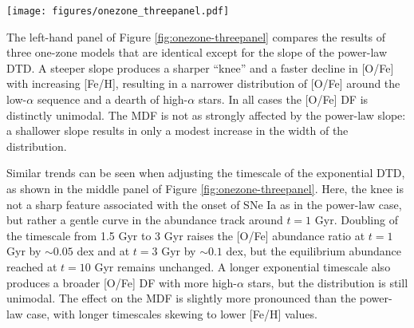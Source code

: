\documentclass[twocolumn,twocolappendix,linenumbers]{aastex631}
\begin{document}
\begin{figure*}
    \centering
    \texttt{[image: figures/onezone\_threepanel.pdf]}
    \caption{Abundance tracks in the [O/Fe]--[Fe/H] plane for one-zone chemical evolution models (see discussion in Section \ref{sec:onezone-results}) which assume the various DTD shapes (see Figure \ref{fig:dtds}). The open symbols along each curve mark logarithmic steps in time. The top and right-hand marginal panels present the distribution functions (DFs) of [Fe/H] and [O/Fe], respectively. For display purposes, these distributions are convolved with a Gaussian kernel with a standard deviation of 0.02 dex. 
    \textit{Left:} A power-law DTD with varying slope $\alpha$. 
    For reference, the solid gray curve represents an exponential DTD with $\tau=3$ Gyr. 
    \textit{Center:} An exponential DTD with varying timescale $\tau$. 
    \textit{Right:} A plateau DTD with varying width $W$. 
    All assume a post-plateau slope of $\alpha=-1.1$. For reference, the solid gray curve represents an exponential DTD with $\tau=3$ Gyr, and the dotted purple curve represents a power-law DTD with $\alpha=-1.1$ and no plateau.}
    \label{fig:onezone-threepanel}
\end{figure*}

The left-hand panel of Figure \ref{fig:onezone-threepanel} compares the results of three one-zone models that are identical except for the slope of the power-law DTD. A steeper slope produces a sharper ``knee'' and a faster decline in [O/Fe] with increasing [Fe/H], resulting in a narrower distribution of [O/Fe] around the low-$\alpha$ sequence and a dearth of high-$\alpha$ stars. 
In all cases the [O/Fe] DF is distinctly unimodal. The MDF is not as strongly affected by the power-law slope: a shallower slope results in only a modest increase in the width of the distribution.

Similar trends can be seen when adjusting the timescale of the exponential DTD, as shown in the middle panel of Figure \ref{fig:onezone-threepanel}. Here, the knee is not a sharp feature associated with the onset of SNe Ia as in the power-law case, but rather a gentle curve in the abundance track around $t=1$ Gyr. Doubling of the timescale from 1.5 Gyr to 3 Gyr raises the [O/Fe] abundance ratio at $t=1$ Gyr by $\sim0.05$ dex and at $t=3$ Gyr by $\sim0.1$ dex, but the equilibrium abundance reached at $t=10$ Gyr remains unchanged. A longer exponential timescale also produces a broader [O/Fe] DF with more high-$\alpha$ stars, but the distribution is still unimodal.
The effect on the MDF is slightly more pronounced than the power-law case, with longer timescales skewing to lower [Fe/H] values.
\end{document}
